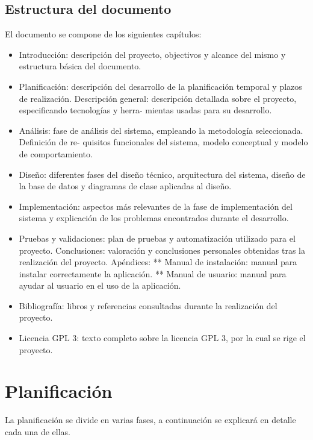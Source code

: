 \documentclass[12pt,a4paperpaper,]{report}
\providecommand{\tightlist}{%
  \setlength{\itemsep}{0pt}\setlength{\parskip}{0pt}}
\begin{document}
\section{Estructura del documento}\label{estructura-del-documento}

El documento se compone de los siguientes capítulos:

\begin{itemize}
\tightlist
\item
  Introducción: descripción del proyecto, objectivos y alcance del mismo
  y estructura básica del documento.
\item
  Planificación: descripción del desarrollo de la planificación temporal
  y plazos de realización. Descripción general: descripción detallada
  sobre el proyecto, especificando tecnologías y herra- mientas usadas
  para su desarrollo.
\item
  Análisis: fase de análisis del sistema, empleando la metodología
  seleccionada. Definición de re- quisitos funcionales del sistema,
  modelo conceptual y modelo de comportamiento.
\item
  Diseño: diferentes fases del diseño técnico, arquitectura del sistema,
  diseño de la base de datos y diagramas de clase aplicadas al diseño.
\item
  Implementación: aspectos más relevantes de la fase de implementación
  del sistema y explicación de los problemas encontrados durante el
  desarrollo.
\item
  Pruebas y validaciones: plan de pruebas y automatización utilizado
  para el proyecto. Conclusiones: valoración y conclusiones personales
  obtenidas tras la realización del proyecto. Apéndices: ** Manual de
  instalación: manual para instalar correctamente la aplicación. **
  Manual de usuario: manual para ayudar al usuario en el uso de la
  aplicación.
\item
  Bibliografía: libros y referencias consultadas durante la realización
  del proyecto.
\item
  Licencia GPL 3: texto completo sobre la licencia GPL 3, por la cual se
  rige el proyecto.
\end{itemize}

\chapter{Planificación}\label{planificaciuxf3n}

La planificación se divide en varias fases, a continuación se explicará
en detalle cada una de ellas.
\end{document}

